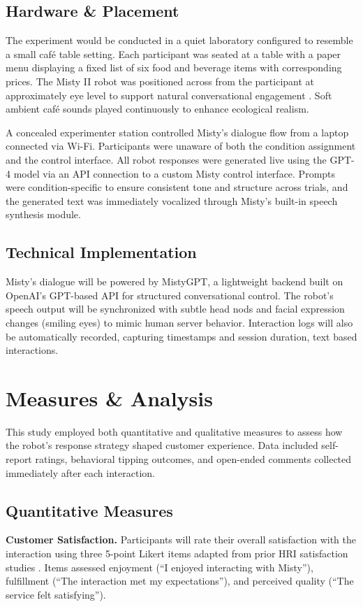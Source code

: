 \documentclass[conference]{IEEEtran}
\begin{document}
\subsection{Hardware \& Placement}
The experiment would be conducted in a quiet laboratory configured to resemble a small café table setting. Each participant was seated at a table with a paper menu displaying a fixed list of six food and beverage items with corresponding prices. The Misty II robot was positioned across from the participant at approximately eye level to support natural conversational engagement \cite{b25, b26}. Soft ambient café sounds played continuously to enhance ecological realism.

A concealed experimenter station controlled Misty's dialogue flow from a laptop connected via Wi-Fi. Participants were unaware of both the condition assignment and the control interface. All robot responses were generated live using the GPT-4 model via an API connection to a custom Misty control interface. Prompts were condition-specific to ensure consistent tone and structure across trials, and the generated text was immediately vocalized through Misty's built-in speech synthesis module.

\subsection{Technical Implementation}
Misty's dialogue will be powered by MistyGPT, a lightweight backend built on OpenAI's GPT-based API for structured conversational control. The robot's speech output will be synchronized with subtle head nods and facial expression changes (smiling eyes) to mimic human server behavior. Interaction logs will also be automatically recorded, capturing timestamps and session duration, text based interactions.

\section{Measures \& Analysis}
\label{sec:measures_analysis}
This study employed both quantitative and qualitative measures to assess how the robot's response strategy shaped customer experience. Data included self-report ratings, behavioral tipping outcomes, and open-ended comments collected immediately after each interaction.

\subsection{Quantitative Measures}
\textbf{Customer Satisfaction.} Participants will rate their overall satisfaction with the interaction using three 5-point Likert items adapted from prior HRI satisfaction studies \cite{b27, b7, b6}. Items assessed enjoyment (``I enjoyed interacting with Misty''), fulfillment (``The interaction met my expectations''), and perceived quality (``The service felt satisfying'').
\end{document}
